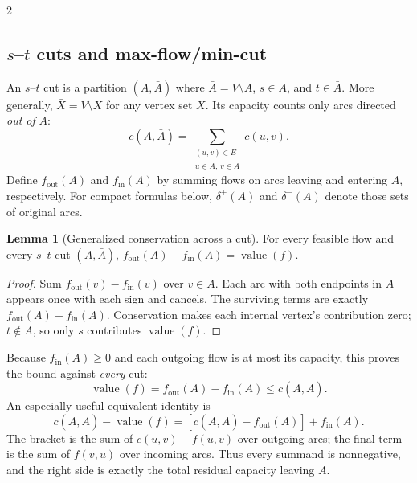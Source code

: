 \documentclass[8pt]{extarticle}
\theoremstyle{definition}
\newtheorem{lemma}[definition]{Lemma}
\begin{document}
\begin{multicols*}{2}
\subsection{\texorpdfstring{$s$--$t$}{s-t} cuts and max-flow/min-cut}\label{nf:cuts}
An $s$--$t$ cut is a partition $(A,\bar A)$ where
$\bar A=V\setminus A$, $s\in A$, and $t\in\bar A$. More generally,
$\bar X=V\setminus X$ for any vertex set $X$. Its capacity counts
only arcs directed \emph{out of} $A$:
\[
 c(A,\bar A)=\sum_{\substack{(u,v)\in E\\u\in A,\,v\in\bar A}}c(u,v).
\]
Define $f_{\mathrm{out}}(A)$ and $f_{\mathrm{in}}(A)$ by summing flows on
arcs leaving and entering $A$, respectively. For compact formulas below,
$\delta^+(A)$ and $\delta^-(A)$ denote those sets of original arcs.
\begin{lemma}[Generalized conservation across a cut]\label{nf:cut-conservation}
For every feasible flow and every $s$--$t$ cut $(A,\bar A)$,
$f_{\mathrm{out}}(A)-f_{\mathrm{in}}(A)=\operatorname{value}(f)$.
\end{lemma}
\begin{proof}
Sum $f_{\mathrm{out}}(v)-f_{\mathrm{in}}(v)$ over $v\in A$.
Each arc with both endpoints in $A$ appears once with each sign and cancels.
The surviving terms are exactly $f_{\mathrm{out}}(A)-f_{\mathrm{in}}(A)$.
Conservation makes each internal vertex's contribution zero; $t\notin A$,
so only $s$ contributes $\operatorname{value}(f)$.
\end{proof}
Because $f_{\mathrm{in}}(A)\ge0$ and each outgoing flow is at most its
capacity, this proves the bound against \emph{every} cut:
\begin{equation}\label{nf:cut-identity}
 \boxed{\operatorname{value}(f)
 =f_{\mathrm{out}}(A)-f_{\mathrm{in}}(A)\le c(A,\bar A).}
\end{equation}
An especially useful equivalent identity is
\begin{equation}\label{nf:cut-slack}
 \boxed{c(A,\bar A)-\operatorname{value}(f)
 =[c(A,\bar A)-f_{\mathrm{out}}(A)]+f_{\mathrm{in}}(A).}
\end{equation}
The bracket is the sum of $c(u,v)-f(u,v)$ over outgoing arcs; the final
term is the sum of $f(v,u)$ over incoming arcs. Thus every summand is
nonnegative, and the right side is exactly the total residual capacity
leaving $A$.


\end{multicols*}
\end{document}
